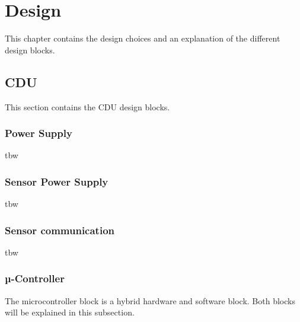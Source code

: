\chapter{Design}
This chapter contains the design choices and an explanation of the different design blocks.

\section{CDU}
This section contains the CDU design blocks.
\subsection{Power Supply}
tbw
%

\subsection{Sensor Power Supply}
tbw

\subsection{Sensor communication}
tbw
%




\subsection{µ-Controller}
The microcontroller block is a hybrid hardware and software block. Both blocks will be explained in this subsection.
